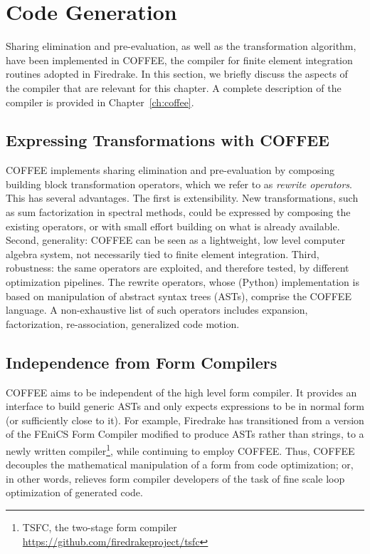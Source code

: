 \section{Code Generation}
\label{sec:codegen}
Sharing elimination and pre-evaluation, as well as the transformation algorithm, have been implemented in COFFEE, the compiler for finite element integration routines adopted in Firedrake. In this section, we briefly discuss the aspects of the compiler that are relevant for this chapter. A complete description of the compiler is provided in Chapter~\ref{ch:coffee}.

\subsection{Expressing Transformations with COFFEE}
COFFEE implements sharing elimination and pre-evaluation by composing building block transformation operators, which we refer to as \emph{rewrite operators}. This has several advantages. The first is extensibility. New transformations, such as sum factorization in spectral methods, could be expressed by composing the existing operators, or with small effort building on what is already available. Second, generality: COFFEE can be seen as a lightweight, low level computer algebra system, not necessarily tied to finite element integration. Third, robustness: the same operators are exploited, and therefore tested, by different optimization pipelines. The rewrite operators, whose (Python) implementation is based on manipulation of abstract syntax trees (ASTs), comprise the COFFEE language. A non-exhaustive list of such operators includes expansion, factorization, re-association, generalized code motion.

\subsection{Independence from Form Compilers}
COFFEE aims to be independent of the high level form compiler. It provides an interface to build generic ASTs and only expects expressions to be in normal form (or sufficiently close to it). For example, Firedrake has transitioned from a version of the FEniCS Form Compiler \cite{FFC-TC} modified to produce ASTs rather than strings, to a newly written compiler\footnote{TSFC, the two-stage form compiler \url{https://github.com/firedrakeproject/tsfc}}, while continuing to employ COFFEE. Thus, COFFEE decouples the mathematical manipulation of a form from code optimization; or, in other words, relieves form compiler developers of the task of fine scale loop optimization of generated code.

